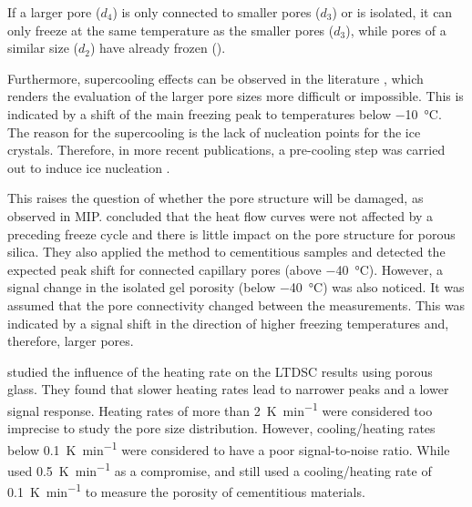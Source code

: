 If a larger pore ($d_4$) is only connected to smaller pores ($d_3$) or is isolated, it can only freeze at the same temperature as the smaller pores ($d_3$), while pores of a similar size ($d_2$) have already frozen ().

Furthermore, supercooling effects can be observed in the literature \cite{setzer.1994,sant.2011}, which renders the evaluation of the larger pore sizes more difficult or impossible.
This is indicated by a shift of the main freezing peak to temperatures below \qty{-10}{\celsius}.
The reason for the supercooling is the lack of nucleation points for the ice crystals.
Therefore, in more recent publications, a pre-cooling step was carried out to induce ice nucleation \cite{nguyen.2021,mueller.2021,joseph.2024}.

This raises the question of whether the pore structure will be damaged, as observed in \ac{MIP}.
\textcite{wu.2015} concluded that the heat flow curves were not affected by a preceding freeze cycle and there is little impact on the pore structure for porous silica.
They also applied the method to cementitious samples and detected the expected peak shift for connected capillary pores (above \qty{-40}{\celsius}).
However, a signal change in the isolated gel porosity (below \qty{-40}{\celsius}) was also noticed.
It was assumed that the pore connectivity changed between the measurements.
This was indicated by a signal shift in the direction of higher freezing temperatures and, therefore, larger pores.

\textcite{neffati.2001} studied the influence of the heating rate on the \ac{LTDSC} results using porous glass.
They found that slower heating rates lead to narrower peaks and a lower signal response.
Heating rates of more than \qty{2}{\kelvin\per\minute} were considered too imprecise to study the pore size distribution.
However, cooling/heating rates below \qty{0.1}{\kelvin\per\minute} were considered to have a poor signal-to-noise ratio.
While \textcite{joseph.2024} used \qty{0.5}{\kelvin\per\minute} as a compromise, \textcite{wu.2015} and \textcite{ghantous.2023} still used a cooling/heating rate of \qty{0.1}{\kelvin\per\minute} to measure the porosity of cementitious materials.

